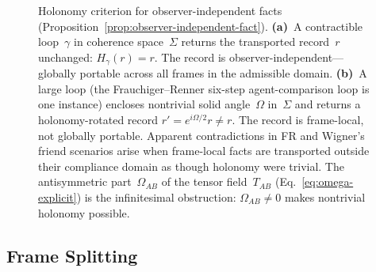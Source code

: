 \documentclass[aps,prd,twocolumn,superscriptaddress,nofootinbib,floatfix]{revtex4-2}
\newcommand{\Sig}{\Sigma}
\newcommand{\Tab}{T_{AB}}
\begin{document}
\begin{figure}[t]
\caption{Holonomy criterion for observer-independent facts (Proposition~\ref{prop:observer-independent-fact}).
\textbf{(a)}~A contractible loop~$\gamma$ in coherence space~$\Sig$ returns the transported
record~$r$ unchanged: $H_\gamma(r) = r$. The record is observer-independent---globally
portable across all frames in the admissible domain.
\textbf{(b)}~A large loop (the Frauchiger--Renner six-step agent-comparison loop is one instance)
encloses nontrivial solid angle~$\Omega$ in~$\Sig$ and returns a holonomy-rotated
record $r' = e^{i\Omega/2}r \neq r$. The record is frame-local, not globally portable.
Apparent contradictions in FR and Wigner's friend scenarios arise when frame-local
facts are transported outside their compliance domain as though holonomy were trivial.
The antisymmetric part~$\Omega_{AB}$ of the tensor field~$\Tab$ (Eq.~\eqref{eq:omega-explicit})
is the infinitesimal obstruction: $\Omega_{AB} \neq 0$ makes nontrivial holonomy possible.}
\label{fig:holonomy-criterion}
\end{figure}

\subsection{Frame Splitting}
\end{document}
